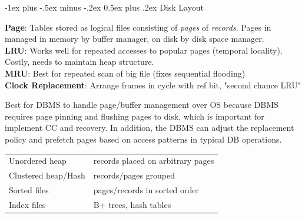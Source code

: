 \documentclass[10pt,landscape]{article}
\makeatletter
\renewcommand{\section}{\@startsection{section}{1}{0mm}%
                                {-1ex plus -.5ex minus -.2ex}%
                                {0.5ex plus .2ex}%
                                {\normalfont\large\bfseries}}
\makeatother
\begin{document}
\begin{multicols}{3}
%
%
%
%


\section{Disk Layout}

\textbf{Page}: Tables stored as logical files consisting of \textit{pages} of \textit{records}. Pages in managed in memory by buffer manager, on disk by disk space manager. \\
\textbf{LRU}: Works well for repeated accesses to popular pages (temporal locality). Costly, needs to maintain heap structure. \\
\textbf{MRU}: Best for repeated scan of big file (fixes sequential flooding) \\
\textbf{Clock Replacement}: Arrange frames in cycle with ref bit, "second chance LRU"

Best for DBMS to handle page/buffer management over OS because DBMS requires page pinning and flushing pages to disk, which is important for implement CC and recovery. In addition, the DBMS can adjust the replacement policy and prefetch pages based on access patterns in typical DB operations.

\begin{tabular}{@{}ll@{}}
Unordered heap      & records placed on arbitrary pages \\
Clustered heap/Hash & records/pages grouped \\
Sorted files        & pages/records in sorted order \\
Index files         & B+ trees, hash tables
\end{tabular}


\end{multicols}
\end{document}
